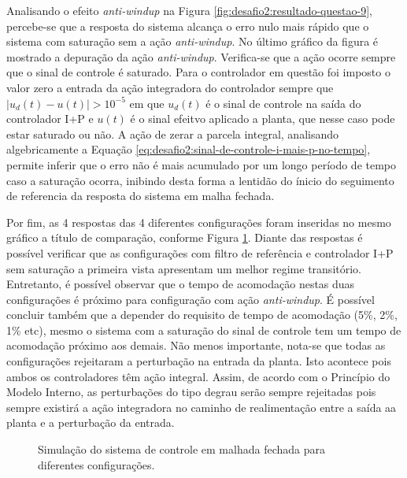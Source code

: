 Analisando o efeito \textit{anti-windup} na Figura
\ref{fig:desafio2:resultado-questao-9}, percebe-se que a resposta do sistema
alcança o erro nulo mais rápido que o sistema com saturação sem a ação
\textit{anti-windup}. No último gráfico da figura é mostrado a depuração da ação
\textit{anti-windup}. Verifica-se que a ação ocorre sempre que o sinal de
controle é saturado. Para o controlador em questão foi imposto o valor zero a
entrada da ação integradora do controlador sempre que $|u_{d}(t) - u(t)| >
10^{-5}$ em que $u_{d}(t)$ é o sinal de controle na saída do controlador I+P e
$u(t)$ é o sinal efeitvo aplicado a planta, que nesse caso pode estar saturado
ou não. A ação de zerar a parcela integral, analisando algebricamente a Equação
\ref{eq:desafio2:sinal-de-controle-i-mais-p-no-tempo}, permite inferir que o erro
não é mais acumulado por um longo período de tempo caso a saturação ocorra,
inibindo desta forma a lentidão do ínicio do seguimento de referencia da
resposta do sistema em malha fechada.

Por fim, as 4 respostas das 4 diferentes configurações foram inseridas no mesmo
gráfico a título de comparação, conforme Figura
\ref{fig:desafio2:resultado-questao-6-9}. Diante das respostas é possível
verificar que as configurações com filtro de referência e controlador I+P sem
saturação a primeira vista apresentam um melhor regime transitório. Entretanto,
é possível observar que o tempo de acomodação nestas duas configurações é
próximo para configuração com ação \textit{anti-windup}. É possível concluir
também que a depender do requisito de tempo de acomodação (5\%, 2\%, 1\% etc),
mesmo o sistema com a saturação do sinal de controle tem um tempo de acomodação
próximo aos demais. Não menos importante, nota-se que todas as configurações
rejeitaram a perturbação na entrada da planta. Isto acontece pois ambos os
controladores têm ação integral. Assim, de acordo com o Princípio do Modelo
Interno, as perturbações do tipo degrau serão sempre rejeitadas pois sempre
existirá a ação integradora no caminho de realimentação entre a saída aa planta
e a perturbação da entrada.

\begin{figure}[!ht]
    \caption{Simulação do sistema de controle em malhada fechada para diferentes
    configurações.}
    \vspace{-10pt}
    \hspace{-30pt}
    \label{fig:desafio2:resultado-questao-6-9}
    \begin{minipage}{\linewidth}
        
    \end{minipage}
\end{figure}

